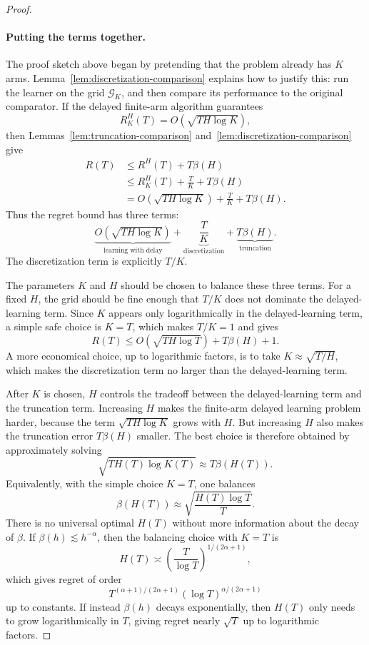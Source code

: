 \documentclass[11pt]{article}
\begin{document}
\begin{proof}
\paragraph{Putting the terms together.}
The proof sketch above began by pretending that the problem already has \(K\)
arms. Lemma~\ref{lem:discretization-comparison} explains how to justify this:
run the learner on the grid \(\mathcal{G}_K\), and then compare its performance
to the original comparator. If the delayed finite-arm algorithm
guarantees
\[
    R^H_K(T) = O\left(\sqrt{T H \log K}\right),
\]
then Lemmas~\ref{lem:truncation-comparison}
and~\ref{lem:discretization-comparison} give
\[
\begin{aligned}
    R(T)
    &\leq
    R^H(T) + T\beta(H) \\
    &\leq
    R^H_K(T) + \frac{T}{K} + T\beta(H) \\
    &=
    O\left(\sqrt{T H \log K}\right)
    +
    \frac{T}{K}
    +
    T\beta(H).
\end{aligned}
\]
Thus the regret bound has three terms:
\[
    \underbrace{O\left(\sqrt{T H \log K}\right)}_{\text{learning with delay}}
    +
    \underbrace{\frac{T}{K}}_{\text{discretization}}
    +
    \underbrace{T\beta(H)}_{\text{truncation}}.
\]
The discretization term is explicitly \(T/K\).

The parameters \(K\) and \(H\) should be chosen to balance these three terms.
For a fixed \(H\), the grid should be fine enough that \(T/K\) does not
dominate the delayed-learning term. Since \(K\) appears only logarithmically in
the delayed-learning term, a simple safe choice is \(K=T\), which makes
\(T/K=1\) and gives
\[
    R(T)
    \leq
    O\left(\sqrt{T H \log T}\right)
    +
    T\beta(H)
    +
    1.
\]
A more economical choice, up to logarithmic factors, is to take
\(K \approx \sqrt{T/H}\), which makes the discretization term no larger than
the delayed-learning term.

After \(K\) is chosen, \(H\) controls the tradeoff between the delayed-learning
term and the truncation term. Increasing \(H\) makes the finite-arm delayed
learning problem harder, because the term \(\sqrt{T H \log K}\) grows with
\(H\). But increasing \(H\) also makes the truncation error \(T\beta(H)\)
smaller. The best choice is therefore obtained by approximately solving
\[
    \sqrt{T H(T) \log K(T)}
    \approx
    T\beta(H(T)).
\]
Equivalently, with the simple choice \(K=T\), one balances
\[
    \beta(H(T))
    \approx
    \sqrt{\frac{H(T)\log T}{T}}.
\]
There is no universal optimal \(H(T)\) without more information about the decay
of \(\beta\). If \(\beta(h) \lesssim h^{-\alpha}\), then the balancing choice
with \(K=T\) is
\[
    H(T) \asymp \left(\frac{T}{\log T}\right)^{1/(2\alpha+1)},
\]
which gives regret of order
\[
    T^{(\alpha+1)/(2\alpha+1)}(\log T)^{\alpha/(2\alpha+1)}
\]
up to constants. If instead \(\beta(h)\) decays exponentially, then \(H(T)\)
only needs to grow logarithmically in \(T\), giving regret nearly
\(\sqrt{T}\) up to logarithmic factors.


\end{proof}
\end{document}
